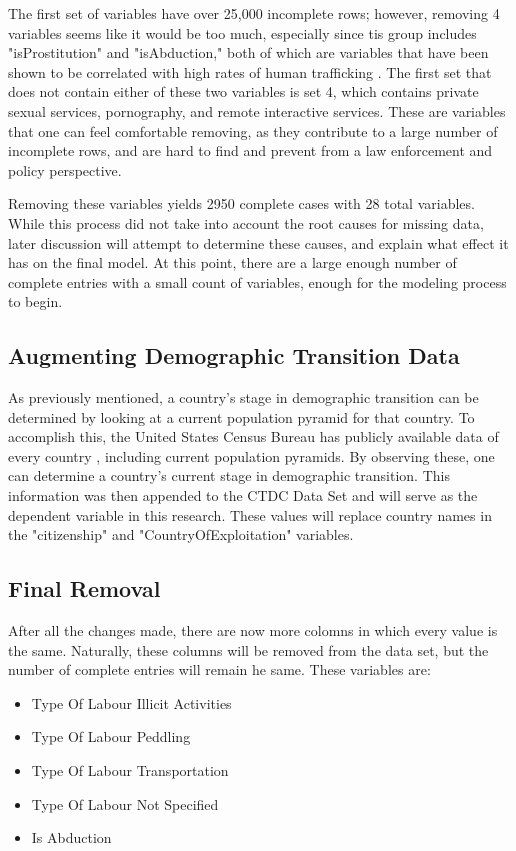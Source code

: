 \documentclass{article} %
\begin{document}
The first set of variables have over 25,000 incomplete rows; however, removing 4 variables seems like it would be too much, especially since tis group includes "isProstitution" and "isAbduction," both of which are variables that have been shown to be correlated with high rates of human trafficking \parencite{SlaveBook, polarisTypology}. The first set that does not contain either of these two variables is set 4, which contains private sexual services, pornography, and remote interactive services. These are variables that one can feel comfortable removing, as they contribute to a large number of incomplete rows, and are hard to find and prevent from a law enforcement and policy perspective.

Removing these variables yields 2950 complete cases with 28 total variables. While this process did not take into account the root causes for missing data, later discussion will attempt to determine these causes, and explain what effect it has on the final model. At this point, there are a large enough number of complete entries with a small count of variables, enough for the modeling process to begin.

\subsection{Augmenting Demographic Transition Data}

As previously mentioned, a country's stage in demographic transition can be determined by looking at a current population pyramid for that country. To accomplish this, the United States Census Bureau has publicly available data of every country \parencite{USCB}, including current population pyramids. By observing these, one can determine a country's current stage in demographic transition. This information was then appended to the CTDC Data Set and will serve as the dependent variable in this research. These values will replace country names in the "citizenship" and "CountryOfExploitation" variables.

\subsection{Final Removal}

After all the changes made, there are now more colomns in which every value is the same. Naturally, these columns will be removed from the data set, but the number of complete entries will remain he same. These variables are:

\begin{itemize}
	\item Type Of Labour Illicit Activities
	\item Type Of Labour Peddling	
	\item Type Of Labour Transportation
	\item Type Of Labour Not Specified
	\item Is Abduction		
\end{itemize}
\end{document}
